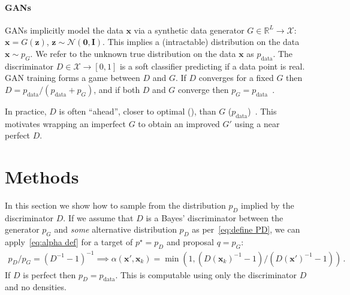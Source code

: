 \documentclass{article}
\renewcommand{\vec}[1]{{\boldsymbol{\mathbf{#1}}}} %
\newcommand{\R}{\mathbb{R}}
\newcommand{\set}[1]{\mathcal{#1}}
\newcommand{\sample}{\sim}
\newcommand{\norm}{\mathcal{N}}
\newcommand{\target}{{p^\star}}
\newcommand{\prop}{q}
\newcommand{\PG}{{p_G}}
\newcommand{\PD}{{p_D}}
\newcommand{\PR}{{p_{\textrm{data}}}}
\newcommand{\accept}{\alpha}
\newcommand{\setx}{\set{X}}
\begin{document}
\paragraph{GANs}
GANs implicitly model the data $\vec x$ via a synthetic data generator $G \in \R^L \rightarrow \setx$: $\vec x = G(\vec z)$, $\vec z \sample \norm(\vec 0, \vec I)$.
This implies a (intractable) distribution on the data $\vec x \sample \PG$.
We refer to the unknown true distribution on the data $\vec x$ as $\PR$.
The discriminator $D \in \setx \rightarrow [0,1]$ is a soft classifier predicting if a data point is real.
GAN training forms a game between $D$ and $G$.
If $D$ converges for a fixed $G$ then $D = \PR/(\PR + \PG)$, and if both $D$ and $G$ converge then $\PG = \PR$~\citep{Goodfellow2014}.

In practice, $D$ is often ``ahead'', closer to optimal (\smash{$\PR/(\PR + \PG)$}), than $G$ ($\PR$)~\citep{Shibuya2017}.
This motivates wrapping an imperfect $G$ to obtain an improved $G'$ using a near perfect $D$.

\section{Methods}
\label{sec:Methods}

In this section we show how to sample from the distribution $\PD$ implied by the discriminator $D$.
If we assume that $D$ is a Bayes' discriminator between the generator $\PG$ and \emph{some} alternative distribution $\PD$ as per~\eqref{eq:define PD}, we can apply~\eqref{eq:alpha def} for a target of $\target=\PD$ and proposal $\prop=\PG$:
\begin{align}
  \PD/\PG = (D^{-1}-1)^{-1} \implies
  \accept(\vec x', \vec x_k) = \min\left(1, (D(\vec x_k)^{-1} - 1)/(D(\vec x')^{-1} - 1)\right)\,. \label{eq:alpha from D}
\end{align}
If $D$ is perfect then $\PD = \PR$.
This is computable using only the discriminator $D$ and no densities.
\end{document}
